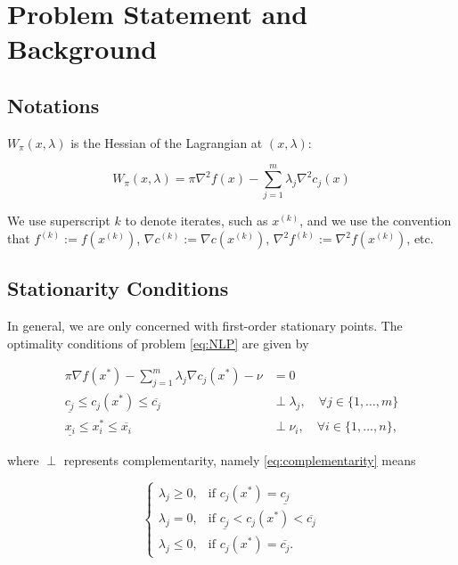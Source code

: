 \section{Problem Statement and Background}
\label{S:problem}

\subsection{Notations}


$W_\pi(x, \lambda)$ is the Hessian of the Lagrangian at $(x, \lambda)$:

\begin{equation}
W_\pi(x, \lambda) = \pi \nabla^2 f(x) - \sum_{j=1}^m \lambda_j \nabla^2 c_j(x)
\end{equation}

We use superscript $k$ to denote iterates, such as $x^{(k)}$, and we use the convention
that $f^{(k)} := f(x^{(k)})$, $\nabla c^{(k)} := \nabla c(x^{(k)})$, $\nabla^2 f^{(k)} := \nabla^2 f(x^{(k)})$, etc.


\subsection{Stationarity Conditions}

In general, we are only concerned with first-order stationary points. The optimality conditions of problem \eqref{eq:NLP}
are given by

\begin{align}\label{eq:KKT-feasibility}
\pi \nabla f(x^*) - \sum\limits_{j = 1}^m \lambda_j \nabla c_j(x^*) - \nu & = 0 \\ 
\underline{c_j} \le c_j(x^*) \le \overline{c_j} & \perp \lambda_j, \quad \forall j \in \{ 1, \ldots, m\} \label{eq:complementarity} \\
\underline{x_i} \le x^*_i \le \overline{x_i} & \perp \nu_i, \quad \forall i \in \{1, \ldots, n\} ,
\end{align}

where $\perp$ represents complementarity, namely \eqref{eq:complementarity} means

\begin{equation}
\begin{cases}
\lambda_j \ge 0, & \text{if } c_j(x^*) = \underline{c_j} \\
\lambda_j = 0, & \text{if } \underline{c_j} < c_j(x^*) < \overline{c_j} \\ 
\lambda_j \le 0, & \text{if } c_j(x^*) = \overline{c_j} .
\end{cases}
\end{equation}

